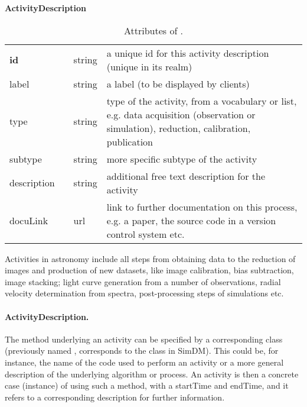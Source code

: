 \begin{table}[ht]
\small
{}\textwidth
\textbf{\normalsize ActivityDescription}\vspace{0.25em}\\
\begin{tabulary}{1.0\textwidth}{@{}p{0cm}p{2.5cm}lL@{}}
\toprule
{} & \head{} &  & \\
\midrule
\textbf{id}  & & string & a unique id for this activity description (unique in its realm)\\
label        & & string & a label (to be displayed by clients)\\
type         & & string & type of the activity, from a vocabulary or list, e.g. data acquisition (observation or simulation), reduction, calibration, publication\\
subtype      & & string & more specific subtype of the activity\\
description  & & string & additional free text description for the activity\\
docuLink     & & url    & link to further documentation on this process, e.g. a 
paper, the source code in a version control system etc.\\
\bottomrule
\end{tabulary}
\caption{Attributes of .}
\end{table}


Activities in astronomy include all steps from obtaining data to the reduction of 
images and production of new datasets, like image calibration, bias subtraction, image stacking; 
light curve generation from a number of observations, radial velocity 
determination from spectra, post-processing steps of simulations etc.

\paragraph{ActivityDescription.}
The method underlying an activity can be specified by a corresponding 
 class (previously named , corresponds 
to the  class in SimDM). This could be, 
for instance, the name of the code used to perform an activity or a more general 
description of the underlying algorithm or process. An activity is then a 
concrete case (instance) of using such a method, with a startTime and endTime, 
and it refers to a corresponding description for further information.

